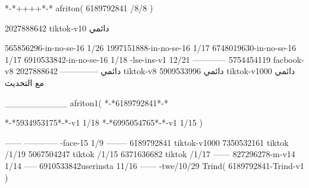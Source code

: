 *-*++++*-*
afriton(
6189792841 /8/8
)

2027888642 tiktok-v10
دائمي

565856296-in-no-se-16 1/26
1997151888-in-no-se-16 1/17
6748019630-in-no-se-16 1/17
6910533842-in-no-se-16 1/18
-lse-ins-v1 12/21
------------
5754454119 facbook-v8
دائمي
--------------
2027888642 tiktok-v8
دائمي
5909533996 tiktok-v1000
دائمي مع التحديث

__________
afriton1(
*-*6189792841*-*


*-*5934953175*-*-v1 1/18
*-*6995054765*-*-v1 1/15
)

------
------------
-face-15 1/9
--------
6189792841 tiktok-v1000
7350532161 tiktok /1/19
5067504247 tiktok /1/15
6371636682 tiktok /1/17
------
827296278-m-v14 1/14
-----
6910533842userinsta 11/16
------
-twe/10/29
Trind(
6189792841-Trind-v1 
)
